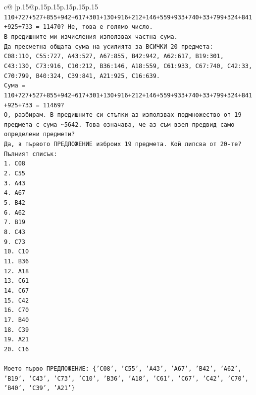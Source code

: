 \documentclass{article}
\begin{document}
{\begin{supertabular}{c@{$\;$}|p{.15\linewidth}@{}p{.15\linewidth}p{.15\linewidth}p{.15\linewidth}p{.15\linewidth}p{.15\linewidth}}
{{{\texttt{110+727+527+855+942+617+301+130+916+212+146+559+933+740+33+799+324+841+925+733 = 11470? Не, това е голямо число.} \\
\texttt{В предишните ми изчисления използвах частна сума.} \\
\texttt{Да пресметна общата сума на усилията за ВСИЧКИ 20 предмета:} \\
\texttt{C08:110, C55:727, A43:527, A67:855, B42:942, A62:617, B19:301, C43:130, C73:916, C10:212, B36:146, A18:559, C61:933, C67:740, C42:33, C70:799, B40:324, C39:841, A21:925, C16:639.} \\
\texttt{Сума = 110+727+527+855+942+617+301+130+916+212+146+559+933+740+33+799+324+841+925+733 = 11469?} \\
\texttt{О, разбирам. В предишните си стъпки аз използвах подмножество от 19 предмета с сума \textasciitilde{}5642. Това означава, че аз съм взел предвид само определени предмети?} \\
\texttt{Да, в първото ПРЕДЛОЖЕНИЕ изброих 19 предмета. Кой липсва от 20{-}те?} \\
\texttt{Пълният списък:} \\
\texttt{1. C08} \\
\texttt{2. C55} \\
\texttt{3. A43} \\
\texttt{4. A67} \\
\texttt{5. B42} \\
\texttt{6. A62} \\
\texttt{7. B19} \\
\texttt{8. C43} \\
\texttt{9. C73} \\
\texttt{10. C10} \\
\texttt{11. B36} \\
\texttt{12. A18} \\
\texttt{13. C61} \\
\texttt{14. C67} \\
\texttt{15. C42} \\
\texttt{16. C70} \\
\texttt{17. B40} \\
\texttt{18. C39} \\
\texttt{19. A21} \\
\texttt{20. C16} \\
\\ 
\texttt{Моето първо ПРЕДЛОЖЕНИЕ: \{'C08', 'C55', 'A43', 'A67', 'B42', 'A62', 'B19', 'C43', 'C73', 'C10', 'B36', 'A18', 'C61', 'C67', 'C42', 'C70', 'B40', 'C39', 'A21'\}} \\
}}}
\end{supertabular}}
\end{document}
